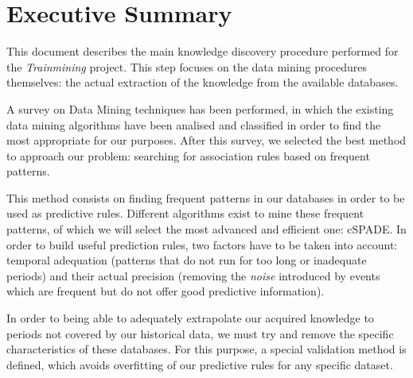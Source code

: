 \documentclass[a4paper,12pt]{article}
\begin{document}
\newcommand\litem[1]{\item{\bfseries #1 }}
\renewcommand{\arraystretch}{1.5} %

\newcommand\headcell[1]{%
  \multicolumn{1}{c|}{\cellcolor{MidnightBlue}\bfseries\sffamily\textcolor{white}{#1}}
}

%

\onehalfspacing



\section*{Executive Summary}

This document describes the main knowledge discovery procedure performed for the \emph{Trainmining} project. This step focuses on the data mining procedures themselves: the actual extraction of the knowledge from the available databases.

A survey on Data Mining techniques has been performed, in which the existing data mining algorithms have been analised and classified in order to find the most appropriate for our purposes. After this survey, we selected the best method to approach our problem: searching for association rules based on frequent patterns.

This method consists on finding frequent patterns in our databases in order to be used as predictive rules. Different algorithms exist to mine these frequent patterns, of which we will select the most advanced and efficient one: cSPADE. In order to build useful prediction rules, two factors have to be taken into account: temporal adequation (patterns that do not run for too long or inadequate periods) and their actual precision (removing the \emph{noise} introduced by events which are frequent but do not offer good predictive information).

In order to being able to adequately extrapolate our acquired knowledge to periods not covered by our historical data, we must try and remove the specific characteristics of these databases. For this purpose, a special validation method is defined, which avoids overfitting of our predictive rules for any specific dataset.
\end{document}
